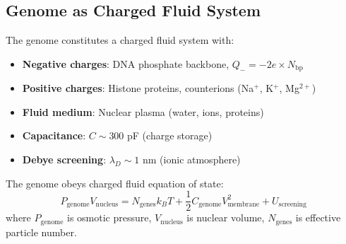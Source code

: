 \subsection{Genome as Charged Fluid System}

\begin{definition}
\label{def:genomic_charged_fluid}
The genome constitutes a charged fluid system with:
\begin{itemize}
\item \textbf{Negative charges}: DNA phosphate backbone, $Q_- = -2e \times N_{\text{bp}}$
\item \textbf{Positive charges}: Histone proteins, counterions (Na$^+$, K$^+$, Mg$^{2+}$)
\item \textbf{Fluid medium}: Nuclear plasma (water, ions, proteins)
\item \textbf{Capacitance}: $C \sim 300$ pF (charge storage)
\item \textbf{Debye screening}: $\lambda_D \sim 1$ nm (ionic atmosphere)
\end{itemize}
\end{definition}

\begin{theorem}
\label{thm:genomic_eos_charged}
The genome obeys charged fluid equation of state:
\begin{equation}
P_{\text{genome}}V_{\text{nucleus}} = N_{\text{genes}}k_BT + \frac{1}{2}C_{\text{genome}}V_{\text{membrane}}^2 + U_{\text{screening}}
\end{equation}
where $P_{\text{genome}}$ is osmotic pressure, $V_{\text{nucleus}}$ is nuclear volume, $N_{\text{genes}}$ is effective particle number.
\end{theorem}


